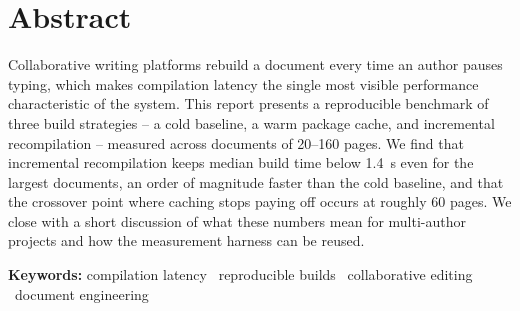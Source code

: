 \chapter*{Abstract}

\begingroup
\setlength{\leftskip}{0pt}\noindent
Collaborative writing platforms rebuild a document every time an author
pauses typing, which makes compilation latency the single most visible
performance characteristic of the system. This report presents a
reproducible benchmark of three build strategies -- a cold baseline, a
warm package cache, and incremental recompilation -- measured across
documents of \numrange{20}{160} pages. We find that incremental
recompilation keeps median build time below \qty{1.4}{\second} even for
the largest documents, an order of magnitude faster than the cold
baseline, and that the crossover point where caching stops paying off
occurs at roughly 60 pages. We close with a short discussion of what
these numbers mean for multi-author projects and how the measurement
harness can be reused.
\endgroup

\vspace{6mm}
\noindent\textbf{\sffamily Keywords:}\enspace
compilation latency \textperiodcentered\ reproducible builds
\textperiodcentered\ collaborative editing \textperiodcentered\
document engineering
